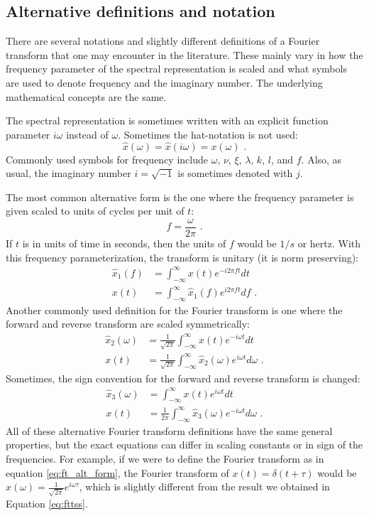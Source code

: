 \subsection{Alternative definitions and notation}
There are several notations and slightly different definitions of a Fourier transform 
that one may encounter in the literature.
These mainly vary in how the frequency parameter of the spectral representation is scaled and 
what symbols are used to denote frequency and the imaginary number.
The underlying mathematical concepts are the same.

The spectral representation is sometimes written with an explicit function parameter $i\omega$ 
instead of $\omega$. Sometimes the hat-notation is not used:
\begin{equation}
    \hat{x}(\omega) = \hat{x}(i\omega) = x(\omega)\,\,.
\end{equation}
Commonly used symbols for frequency include $\omega$, $\nu$, $\xi$, $\lambda$, $k$, $l$, and $f$. 
Also, as usual, the imaginary number $i=\sqrt{-1}$ is sometimes denoted with $j$.

The most common alternative form is the one where the frequency parameter is given scaled to 
units of cycles per unit of $t$:
\begin{equation}
    f = \frac{\omega}{2\pi}\,\,.
\end{equation}
If $t$ is in units of time in seconds, then the units of $f$ would be $1/s$ or hertz. 
With this frequency parameterization, the transform is unitary (it is norm preserving):
\begin{align}
    \hat{x}_1(f) & =  \int_{-\infty}^{\infty} x(t) e^{-i 2\pi f  t}d t            \\
    x(t)         & = \int_{-\infty}^{\infty} \hat{x}_1(f) e^{i 2\pi f t} d f\,\,.
\end{align}
Another commonly used definition for the Fourier transform is one where the forward and reverse transform are scaled symmetrically:
\begin{align}
    \hat{x}_2(\omega) & = \frac{1}{\sqrt{2\pi}} \int_{-\infty}^{\infty} x(t) e^{-i\omega t}dt \label{eq:ft_alt_form} \\
    x(t)              & = \frac{1}{\sqrt{2\pi}} \int_{-\infty}^{\infty} \hat{x}_2(\omega) e^{i\omega t}d\omega\,\,.
\end{align}
Sometimes, the sign convention for the forward and reverse transform is changed:
\begin{align}
    \hat{x}_3(\omega) & =  \int_{-\infty}^{\infty} x(t) e^{i\omega t}dt                                       \\
    x(t)              & = \frac{1}{2\pi} \int_{-\infty}^{\infty} \hat{x}_3(\omega) e^{-i\omega t}d\omega\,\,.
\end{align}
All of these alternative Fourier transform definitions have the same general properties, 
but the exact equations can differ in scaling constants or in sign of the frequencies.
For example, if we were to define the Fourier transform as in equation \ref{eq:ft_alt_form}, 
the Fourier transform of $x(t)=\delta(t+\tau)$ would be $\hat{x}(\omega)=\frac{1}{\sqrt{2\pi}}e^{i\omega \tau}$,
which is slightly different from the result we obtained in Equation \ref{eq:fttss}.
